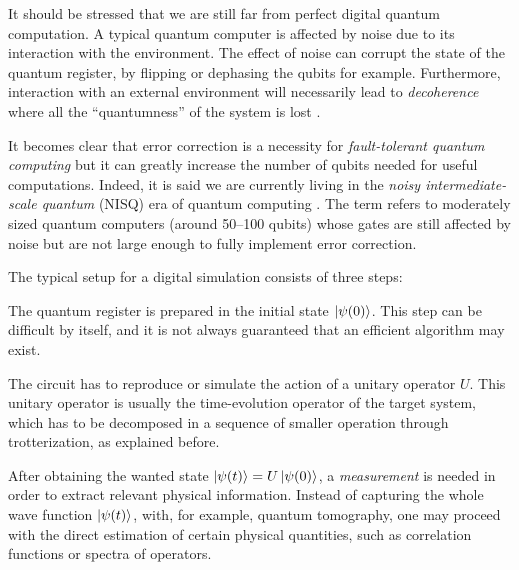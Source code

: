 \medskip

It should be stressed that we are still far from perfect digital quantum computation.
A typical quantum computer is affected by noise due to its interaction with the environment.
The effect of noise can corrupt the state of the quantum register, by flipping or dephasing the qubits for example.
Furthermore, interaction with an external environment will necessarily lead to \emph{decoherence} where all the ``quantumness'' of the system is lost \cite{zurek1991decoherence, schlosshauer2014decoherence, schlosshauer2019decoherence}.

It becomes clear that error correction is a necessity for \emph{fault-tolerant quantum computing} \cite{preskill1997faulttolerant, shor1996faulttolerant} but it can greatly increase the number of qubits needed for useful computations.
Indeed, it is said we are currently living in the \emph{noisy intermediate-scale quantum} (NISQ) era of quantum computing \cite{preskill2018quantumcomputing}.
The term refers to moderately sized quantum computers (around 50--100 qubits) whose gates are still affected by noise but are not large enough to fully implement error correction.

\medskip

The typical setup for a digital simulation consists of three steps:
\begin{description}[font=\normalfont\itshape, labelsep=1.1em]
    \item[Initial-state preparation.] The quantum register is prepared in the initial state $\ket{\psi(0)}$.
        This step can be difficult by itself, and it is not always guaranteed that an efficient algorithm may exist.

    \item[Unitary evolution.] The circuit has to reproduce or simulate the action of a unitary operator $U$.
        This unitary operator is usually the time-evolution operator of the target system, which has to be decomposed in a sequence of smaller operation through trotterization, as explained before.

    \item[Final measurement.] After obtaining the wanted state $\ket{\psi(t)} = U \ket{\psi(0)}$, a \emph{measurement} is needed in order to extract relevant physical information.
        Instead of capturing the whole wave function $\ket{\psi(t)}$, with, for example, quantum tomography, one may proceed with the direct estimation of certain physical quantities, such as correlation functions or spectra of operators.
\end{description}


